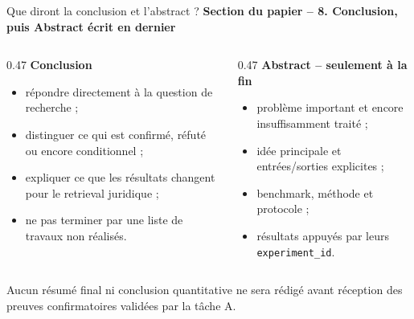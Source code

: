 \documentclass[aspectratio=169,10pt]{beamer}
\newcommand{\warnbox}[1]{%
  \begin{center}
  \colorbox{red!10}{\parbox{0.92\linewidth}{\centering #1}}
  \end{center}}
\newcommand{\papersection}[1]{%
  {\scriptsize\textcolor{accent}{\textbf{Section du papier -- #1}}}\par\vspace{0.55em}}
\begin{document}
\begin{frame}{Que diront la conclusion et l'abstract ?}
  \papersection{8. Conclusion, puis Abstract écrit en dernier}
  \footnotesize
  \begin{columns}[T,onlytextwidth]
    \begin{column}{0.47\textwidth}
      \textbf{\color{accent}Conclusion}
      \begin{itemize}\setlength{\itemsep}{0.45em}
        \item répondre directement à la question de recherche ;
        \item distinguer ce qui est confirmé, réfuté ou encore conditionnel ;
        \item expliquer ce que les résultats changent pour le retrieval juridique ;
        \item ne pas terminer par une liste de travaux non réalisés.
      \end{itemize}
    \end{column}
    \begin{column}{0.47\textwidth}
      \textbf{\color{ok}Abstract -- seulement à la fin}
      \begin{itemize}\setlength{\itemsep}{0.45em}
        \item problème important et encore insuffisamment traité ;
        \item idée principale et entrées/sorties explicites ;
        \item benchmark, méthode et protocole ;
        \item résultats appuyés par leurs \texttt{experiment\_id}.
      \end{itemize}
    \end{column}
  \end{columns}

  \vspace{0.7em}
  \warnbox{\scriptsize Aucun résumé final ni conclusion quantitative ne sera rédigé avant
  réception des preuves confirmatoires validées par la tâche A.}
\end{frame}
\end{document}
